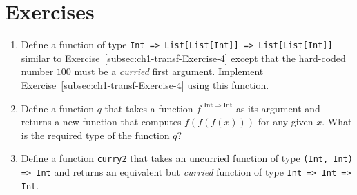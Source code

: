 \section{Exercises}
\begin{enumerate}
\item Define a function of type \texttt{}\lstinline!Int => List[List[Int]] => List[List[Int]]!
similar to Exercise~\ref{subsec:ch1-transf-Exercise-4} except that
the hard-coded number $100$ must be a \emph{curried} first argument.
Implement Exercise~\ref{subsec:ch1-transf-Exercise-4} using this
function.
\item Define a function $q$ that takes a function $f^{:\text{Int}\Rightarrow\text{Int}}$
as its argument and returns a new function that computes $f(f(f(x)))$
for any given $x$. What is the required type of the function $q$?
\item Define a function \lstinline!curry2! that takes an uncurried function
of type \texttt{}\lstinline!(Int, Int) => Int! and returns an equivalent
but \emph{curried} function of type \texttt{}\lstinline!Int => Int => Int!.
\end{enumerate}

